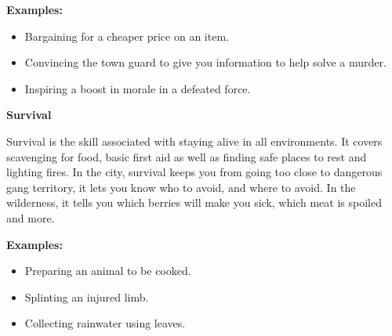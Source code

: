 \begin{displayquote}
    \textbf{Examples:}
    \begin{itemize}
        \item Bargaining for a cheaper price on an item.
        \item Convincing the town guard to give you information to help solve a murder.
        \item Inspiring a boost in morale in a defeated force.
    \end{itemize}
\end{displayquote}

\textbf{Survival}

Survival is the skill associated with staying alive in all environments. It covers scavenging for food, basic first aid as well as finding safe places to rest and lighting fires. In the city, survival keeps you from going too close to dangerous gang territory, it lets you know who to avoid, and where to avoid. In the wilderness, it tells you which berries will make you sick, which meat is spoiled and more.

\begin{displayquote}
    \textbf{Examples:}
    \begin{itemize}
        \item Preparing an animal to be cooked.
        \item Splinting an injured limb.
        \item Collecting rainwater using leaves.
    \end{itemize}
\end{displayquote}